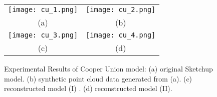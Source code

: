 
\begin{figure} [htbp]
\begin{center}
\begin{tabular}{cc}
\texttt{[image: cu\_1.png]} &
\texttt{[image: cu\_2.png]} \\
(a) & (b) \\
\texttt{[image: cu\_3.png]} &
\texttt{[image: cu\_4.png]} \\
(c) & (d)
\end{tabular}
\end{center}
\caption{Experimental Results of Cooper Union model:
      (a) original Sketchup model.
      (b) synthetic point cloud data generated from (a).
      (c) reconstructed model (I) .
      (d) reconstructed model (II).}
\label{fig:ER_Fig1}
\end{figure}

